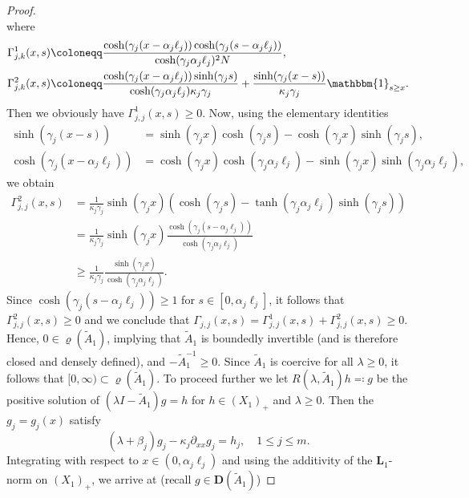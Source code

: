 \documentclass[a4paper,11pt,reqno]{amsart}
\def\1{\mathbbm{1}}
\theoremstyle{plain}
\numberwithin{equation}{section}
\begin{document}
\begin{proof}
\begin{equation*}
\end{equation*}
where
\begin{align*}
\Gamma^1_{j,k}(x,s) &\coloneqq \frac{\cosh(\gamma_j (x-\alpha_j \ell_j)) \cosh(\gamma_j (s-\alpha_j \ell_j)) }{ \cosh(\gamma_j \alpha_j \ell_j)^2 N}, \\
\Gamma^2_{j,k}(x,s) &\coloneqq \frac{ \cosh(\gamma_j (x-\alpha_j \ell_j)) \sinh(\gamma_j s) }{ \cosh(\gamma_j \alpha_j \ell_j) \kappa_j \gamma_j }+\frac{ \sinh(\gamma_j (x-s)) }{ \kappa_j \gamma_j } \1_{s \geq x}.
\end{align*}
Then we obviously have $\Gamma^1_{j,j}(x,s)\ge 0$. Now, using the elementary identities
\begin{align*}
\sinh(\gamma_j (x-s))& = \sinh(\gamma_j x) \cosh(\gamma_j s)-\cosh(\gamma_j x) \sinh(\gamma_j s),\\
\cosh(\gamma_j (x-\alpha_j \ell_j))& = \cosh(\gamma_j x) \cosh(\gamma_j \alpha_j \ell_j)-\sinh(\gamma_j x) \sinh(\gamma_j \alpha_j \ell_j),
\end{align*}
we obtain
\begin{align*}
\Gamma^2_{j,j} (x,s)&= \frac{1}{ \kappa_j \gamma_j}\sinh(\gamma_j x) \left( \cosh(\gamma_j s)-\tanh(\gamma_j \alpha_j \ell_j) \sinh(\gamma_j s) \right)\\
&=\frac{1}{ \kappa_j \gamma_j}\sinh(\gamma_j x)\frac{ \cosh(\gamma_j(s-\alpha_j \ell_j)) }{ \cosh(\gamma_j \alpha_j \ell_j) }\\
&\geq \frac{1}{ \kappa_j \gamma_j}\frac{\sinh(\gamma_j x)}{ \cosh(\gamma_j \alpha_j \ell_j)}.
\end{align*}
Since $\cosh(\gamma_j(s-\alpha_j \ell_j))\ge 1$ for $s\in [0,\alpha_j\ell_j]$, it follows that $\Gamma^2_{j,j} (x,s)\ge 0$ and we conclude that $\Gamma_{j,j}(x,s) = \Gamma^1_{j,j}(x,s) + \Gamma^2_{j,j}(x,s)\ge 0$. Hence, $0\in \varrho(\tilde{A}_1)$, implying that $\tilde{A}_1$ is boundedly invertible (and is therefore closed and densely defined), and $-\tilde{A}_1^{-1}\ge 0$. Since $\tilde{A}_1$ is coercive for all $\lambda\ge 0$, it follows that $[0,\infty)\subset \varrho(\tilde{A}_1)$. To proceed further we let $R(\lambda,\tilde{A}_1)h\eqqcolon g$ be the positive solution of $(\lambda I-\tilde{A}_1)g=h$ for $h\in (X_1)_+$ and $\lambda\ge 0$. Then the $g_j=g_j(x)$ satisfy
\begin{equation*}
(\lambda+\beta_j)g_j-\kappa_j\partial_{xx}g_j=h_j, \quad 1 \le j\le m.
\end{equation*}
Integrating with respect to $x\in (0,\alpha_j\ell_j)$ and using the additivity of the ${\bm L}_1$-norm on $(X_1)_+$, we arrive at (recall $g\in \bm{D}(\tilde{A}_1)$)

\end{proof}
\end{document}
